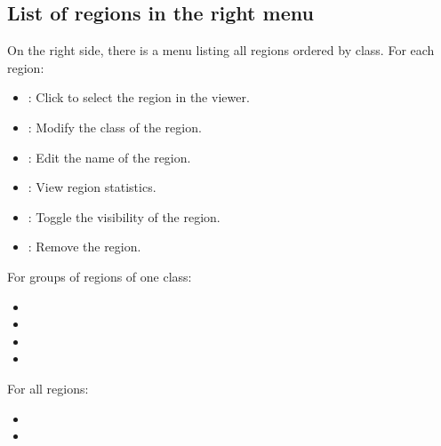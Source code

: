 \documentclass[letterpaper,10pt,english,openany,oneside]{sphinxmanual}
\begin{document}
\subsection{List of regions in the right menu}
\label{\detokenize{docs/starting/regions:list-of-regions-in-the-right-menu}}
\sphinxAtStartPar
{}

\sphinxAtStartPar
On the right side, there is a menu listing all regions ordered by class. For each region:
\begin{itemize}
\item {} 
\sphinxAtStartPar
{}: Click to select the region in the viewer.

\item {} 
\sphinxAtStartPar
{}: Modify the class of the region.

\item {} 
\sphinxAtStartPar
{}: Edit the name of the region.

\item {} 
\sphinxAtStartPar
{}: View region statistics.

\item {} 
\sphinxAtStartPar
{}: Toggle the visibility of the region.

\item {} 
\sphinxAtStartPar
{}: Remove the region.

\end{itemize}

\sphinxAtStartPar
For groups of regions of one class:
\begin{itemize}
\item {} 
\sphinxAtStartPar
{}

\item {} 
\sphinxAtStartPar
{}

\item {} 
\sphinxAtStartPar
{}

\item {} 
\sphinxAtStartPar
{}

\end{itemize}

\sphinxAtStartPar
For all regions:
\begin{itemize}
\item {} 
\sphinxAtStartPar
{}

\item {} 
\sphinxAtStartPar
{}

\end{itemize}
\end{document}

